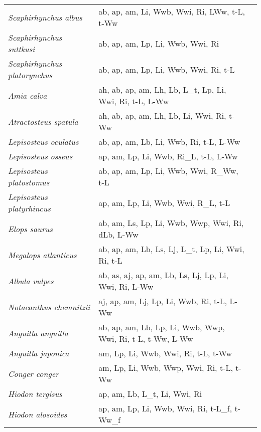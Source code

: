 {\begin{longtable}[c]{p{3.5cm}p{5.5cm}p{5.5cm}}
\emph{Scaphirhynchus albus} &  ab, ap, am, Li, Wwb, Wwi, Ri, LWw, t-L, t-Ww & \citet{KeenJenk1993,GeorSlac2012,KeenMax1993} \\
\emph{Scaphirhynchus suttkusi} &  ab, ap, am, Lp, Li, Wwb, Wwi, Ri & \citet{KuhaRide2016,GeorSlac2012} \\
\emph{Scaphirhynchus platorynchus} &  ab, ap, am, Lp, Li, Wwb, Wwi, Ri, t-L & \citet{Helm1974} \\
\emph{Amia calva} &  ah, ab, ap, am, Lh, Lb, L\_t, Lp, Li, Wwi, Ri, t-L, L-Ww & \citet{EtniStar1993} \\
\emph{Atractosteus spatula} &  ah, ab, ap, am, Lh, Lb, Li, Wwi, Ri, t-Ww & \citet{Clay2004} \\
\emph{Lepisosteus oculatus} &  ab, ap, am, Lb, Li, Wwb, Ri, t-L, L-Ww & \citet{WallYeag1990,Love2004} \\
\emph{Lepisosteus osseus} &  ap, am, Lp, Li, Wwb, Ri\_L, t-L, L-Ww & \citet{WallYeag1990,Kell2012} \\
\emph{Lepisosteus platostomus} &  ab, ap, am, Lp, Li, Wwb, Wwi, R\_Ww, t-L & \citet{WallYeag1990,SuttGrie2009} \\
\emph{Lepisosteus platyrhincus} &  ap, am, Lp, Li, Wwb, Wwi, R\_L, t-L & \citet{MuriPark2009,WallYeag1990} \\
\emph{Elops saurus} &  ab, am, Ls, Lp, Li, Wwb, Wwp, Wwi, Ri, dLb, L-Ww & \citet{SantArbo1993,Leve2014} \\
\emph{Megalops atlanticus} &  ab, ap, am, Lb, Ls, Lj, L\_t, Lp, Li, Wwi, Ri, t-L & \citet{CrabCyr1995} \\
\emph{Albula vulpes} &  ab, as, aj, ap, am, Lb, Ls, Lj, Lp, Li, Wwi, Ri, L-Ww & \citet{Brug1974} \\
\emph{Notacanthus chemnitzii} &  aj, ap, am, Lj, Lp, Li, Wwb, Ri, t-L, L-Ww & \citet{VediOrlo2016} \\
\emph{Anguilla anguilla} &  ab, ap, am, Lb, Lp, Li, Wwb, Wwp, Wwi, Ri, t-L, t-Ww, L-Ww & \citet{PenaTesc1970,Tesc2003,AngePour2005} \\
\emph{Anguilla japonica} &  am, Lp, Li, Wwb, Wwi, Ri, t-L, t-Ww & \citet{TanaKaga2001,CastEdwa2017,GuanWang1994} \\
\emph{Conger conger} &  am, Lp, Li, Wwb, Wwp, Wwi, Ri, t-L, t-Ww & \citet{Cunn1981,SullMori2003} \\
\emph{Hiodon tergisus} &  ap, am, Lb, L\_t, Li, Wwi, Ri &  \\
\emph{Hiodon alosoides} &  ap, am, Lp, Li, Wwb, Wwi, Ri, t-L\_f, t-Ww\_f & \citet{WallYeag1990,DonaKooy2011} \\

\end{longtable}}
